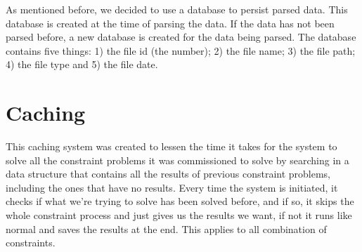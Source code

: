 As mentioned before, we decided to use a database to persist parsed data. This database is created at the time of parsing the data. If the data has not been parsed before, a new database is created for the data being parsed. The database contains five things: 1) the file id (the \INODE number); 2) the file name; 3) the file path; 4) the file type and 5) the file date.

\section{Caching}
\label{caching}

This caching system was created to lessen the time it takes for the system to solve all the constraint problems it was commissioned to solve by searching in a data structure that contains all the results of previous constraint problems, including the ones that have no results. Every time the system is initiated, it checks if what we're trying to solve has been solved before, and if so, it skips the whole constraint process and just gives us the results we want, if not it runs like normal and saves the results at the end. This applies to all combination of constraints.